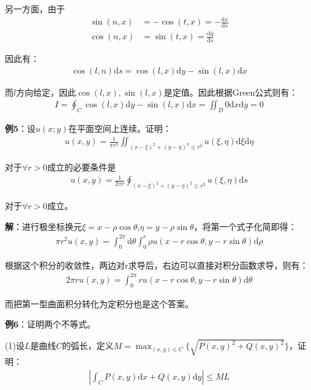 \documentclass{ctexart}
\let\oldtextbf\textbf
\renewcommand{\textbf}[1]{\textcolor{brown!50!red}{\oldtextbf{#1}}}
\begin{document}
另一方面，由于
\begin{align*}
\sin(n,x)&=-\cos(t,x)=-\frac{\mathrm{d}x}{\mathrm{d}s}\\
\cos(n,x)&=\sin(t,x)=\frac{\mathrm{d}y}{\mathrm{d}s}
\end{align*}

因此有：
\begin{align*}
\cos(l,n)\mathrm{d}s=\cos(l,x)\mathrm{d}y-\sin(l,x)\mathrm{d}x   
\end{align*}

而$l$方向给定，因此$\cos(l,x),\sin(l,x)$是定值。因此根据Green公式则有：
\begin{align*}
I=\oint_C\cos(l,x)\mathrm{d}y-\sin(l,x)\mathrm{d}x =\iint_D 0\mathrm{d}x\mathrm{d}y=0    
\end{align*}

\textbf{\color{brown!50!red}例5}：设$u(x;y)$在平面空间上连续。证明：
\begin{align*}
    u(x,y)=\frac{1}{\pi r^2}\iint_{(x-\xi)^2+(y-\eta)^2\leq r^2}u(\xi,\eta)\mathrm{d}\xi\mathrm{d}\eta
\end{align*}

对于$\forall r>0$成立的必要条件是
\begin{align*}
     u(x,y)=\frac{1}{2\pi r}\oint_{(x-\xi)^2+(y-\eta)^2\leq r^2}u(\xi,\eta)\mathrm{d}s
\end{align*}

对于$\forall r>0$成立。

\textbf{\color{brown!50!red}解}：进行极坐标换元$\xi=x-\rho\cos\theta$,$\eta=y-\rho\sin\theta$，将第一个式子化简即得：
\begin{align*}
    \pi r^2 u(x,y)=\int_0^{2\pi}\mathrm{d}\theta\int_0^r \rho u(x-r\cos\theta,y-r\sin\theta)\mathrm{d}\rho
\end{align*}

根据这个积分的收敛性，两边对r求导后，右边可以直接对积分函数求导，则有：
\begin{align*}
    2\pi r u(x,y)=\int_0^{2\pi} r u(x-r\cos\theta,y-r\sin\theta)\mathrm{d}\theta
\end{align*}

而把第一型曲面积分转化为定积分也是这个答案。

\textbf{\color{brown!50!red}例6}：证明两个不等式。

(1)设$L$是曲线$C$的弧长，定义$M=\max_{(x,y)\in C}\{\sqrt{P(x,y)^2+Q(x,y)^2}\}$，证明：
\begin{align*}
    \left | \int_CP(x,y)\mathrm{d}x+Q(x,y)\mathrm{d}y\right | \leq ML  
\end{align*}
\end{document}

